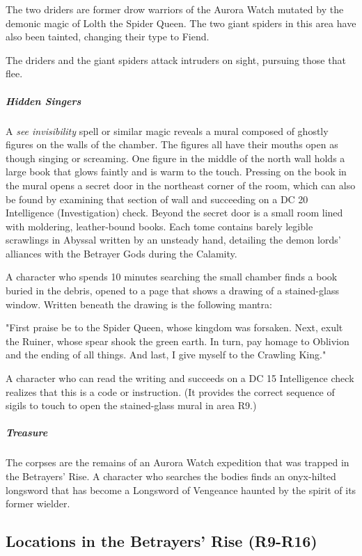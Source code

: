 \documentclass[10pt,a4paper,twoside,bg=print,twocolumn,openany,nodeprecatedcode]{dndbook}
\begin{document}
The two driders are former drow warriors of the Aurora Watch mutated by the demonic magic of Lolth the Spider Queen. The two giant spiders in this area have also been tainted, changing their type to Fiend.

The driders and the giant spiders attack intruders on sight, pursuing those that flee.

\subparagraph{Hidden Singers}
A \textit{see invisibility} spell or similar magic reveals a mural composed of ghostly figures on the walls of the chamber. The figures all have their mouths open as though singing or screaming. One figure in the middle of the north wall holds a large book that glows faintly and is warm to the touch. Pressing on the book in the mural opens a secret door in the northeast corner of the room, which can also be found by examining that section of wall and succeeding on a DC 20 Intelligence (Investigation) check. Beyond the secret door is a small room lined with moldering, leather-bound books. Each tome contains barely legible scrawlings in Abyssal written by an unsteady hand, detailing the demon lords' alliances with the Betrayer Gods during the Calamity.

A character who spends 10 minutes searching the small chamber finds a book buried in the debris, opened to a page that shows a drawing of a stained-glass window. Written beneath the drawing is the following mantra:

\begin{DndReadAloud}{}
"First praise be to the Spider Queen, whose kingdom was forsaken. Next, exult the Ruiner, whose spear shook the green earth. In turn, pay homage to Oblivion and the ending of all things. And last, I give myself to the Crawling King."

\end{DndReadAloud}

A character who can read the writing and succeeds on a DC 15 Intelligence check realizes that this is a code or instruction. (It provides the correct sequence of sigils to touch to open the stained-glass mural in area R9.)

\subparagraph{Treasure}
The corpses are the remains of an Aurora Watch expedition that was trapped in the Betrayers' Rise. A character who searches the bodies finds an onyx-hilted longsword that has become a Longsword of Vengeance haunted by the spirit of its former wielder.

\subsection{Locations in the Betrayers' Rise (R9-R16)}
\end{document}
